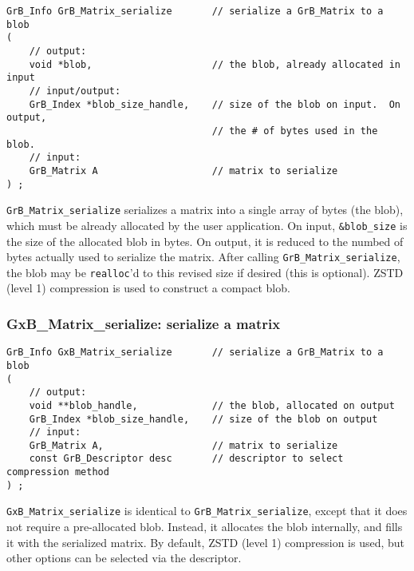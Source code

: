 \documentclass[12pt]{article}
\begin{document}
\begin{mdframed}[userdefinedwidth=6in]
{\footnotesize
\begin{verbatim}
GrB_Info GrB_Matrix_serialize       // serialize a GrB_Matrix to a blob
(
    // output:
    void *blob,                     // the blob, already allocated in input
    // input/output:
    GrB_Index *blob_size_handle,    // size of the blob on input.  On output,
                                    // the # of bytes used in the blob.
    // input:
    GrB_Matrix A                    // matrix to serialize
) ;
\end{verbatim}
} \end{mdframed}

\verb'GrB_Matrix_serialize' serializes a matrix into a single array of bytes
(the blob), which must be already allocated by the user application.
On input, \verb'&blob_size' is the size of the allocated blob in bytes.
On output, it is reduced to the numbed of bytes actually used to serialize
the matrix.  After calling \verb'GrB_Matrix_serialize', the blob may be
\verb'realloc''d to this revised size if desired (this is optional).
ZSTD (level 1) compression is used to construct a compact blob.

\subsubsection{{\sf GxB\_Matrix\_serialize:}      serialize a matrix}
\label{matrix_serialize_GxB}

\begin{mdframed}[userdefinedwidth=6in]
{\footnotesize
\begin{verbatim}
GrB_Info GxB_Matrix_serialize       // serialize a GrB_Matrix to a blob
(
    // output:
    void **blob_handle,             // the blob, allocated on output
    GrB_Index *blob_size_handle,    // size of the blob on output
    // input:
    GrB_Matrix A,                   // matrix to serialize
    const GrB_Descriptor desc       // descriptor to select compression method
) ;
\end{verbatim}
} \end{mdframed}

\verb'GxB_Matrix_serialize' is identical to \verb'GrB_Matrix_serialize', except
that it does not require a pre-allocated blob.  Instead, it allocates the blob
internally, and fills it with the serialized matrix.  By default, ZSTD (level 1)
compression is used, but other options can be selected via the descriptor.
\end{document}
